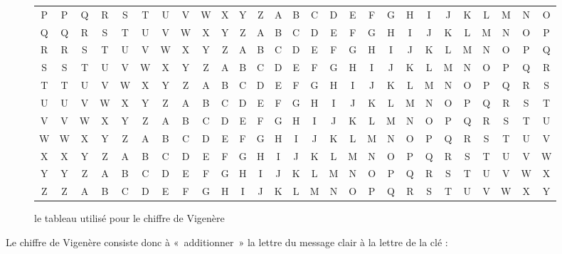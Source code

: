\begin{figure}[h]
\begin{center}
\begin{tabular}{c|c@{}c@{}c@{}c@{}c@{}c@{}c@{}c@{}c@{}c@{}c@{}c@{}c@{}c@{}c@{}c@{}c@{}c@{}c@{}c@{}c@{}c@{}c@{}c@{}c@{}c}
      P & P & Q & R & S & T & U & V & W & X & Y & Z & A & B & C & D & E & F & G & H & I & J & K & L & M & N & O \\
      Q & Q & R & S & T & U & V & W & X & Y & Z & A & B & C & D & E & F & G & H & I & J & K & L & M & N & O & P \\
      R & R & S & T & U & V & W & X & Y & Z & A & B & C & D & E & F & G & H & I & J & K & L & M & N & O & P & Q \\
      S & S & T & U & V & W & X & Y & Z & A & B & C & D & E & F & G & H & I & J & K & L & M & N & O & P & Q & R \\
      T & T & U & V & W & X & Y & Z & A & B & C & D & E & F & G & H & I & J & K & L & M & N & O & P & Q & R & S \\
      U & U & V & W & X & Y & Z & A & B & C & D & E & F & G & H & I & J & K & L & M & N & O & P & Q & R & S & T \\
      V & V & W & X & Y & Z & A & B & C & D & E & F & G & H & I & J & K & L & M & N & O & P & Q & R & S & T & U \\
      W & W & X & Y & Z & A & B & C & D & E & F & G & H & I & J & K & L & M & N & O & P & Q & R & S & T & U & V \\
      X & X & Y & Z & A & B & C & D & E & F & G & H & I & J & K & L & M & N & O & P & Q & R & S & T & U & V & W \\
      Y & Y & Z & A & B & C & D & E & F & G & H & I & J & K & L & M & N & O & P & Q & R & S & T & U & V & W & X \\
      Z & Z & A & B & C & D & E & F & G & H & I & J & K & L & M & N & O & P & Q & R & S & T & U & V & W & X & Y \\
    \end{tabular}
  \end{center}
  \caption{le tableau utilisé pour le chiffre de Vigenère}
  \label{fig:VigenereTableau}
\end{figure}

Le chiffre de Vigenère consiste donc à «~additionner~» la lettre du
message clair à la lettre de la clé : 

